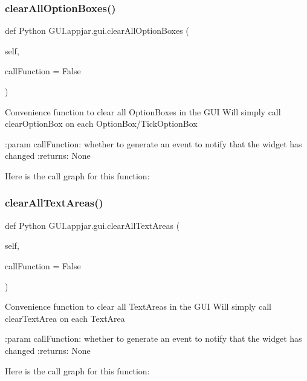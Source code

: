 \subsubsection{\texorpdfstring{clear\+All\+Option\+Boxes()}{clearAllOptionBoxes()}}
{\footnotesize\ttfamily def Python G\+U\+I.\+appjar.\+gui.\+clear\+All\+Option\+Boxes (\begin{DoxyParamCaption}\item[{}]{self,  }\item[{}]{call\+Function = {\ttfamily False} }\end{DoxyParamCaption})}

\begin{DoxyVerb}Convenience function to clear all OptionBoxes in the GUI
Will simply call clearOptionBox on each OptionBox/TickOptionBox

:param callFunction: whether to generate an event to notify that the widget has changed
:returns: None
\end{DoxyVerb}
 Here is the call graph for this function\+:
\mbox{\label{class_python_01_g_u_i_1_1appjar_1_1gui_aed07ef3bc3baf1e1b1545ba0cf12c7e1}} 
\subsubsection{\texorpdfstring{clear\+All\+Text\+Areas()}{clearAllTextAreas()}}
{\footnotesize\ttfamily def Python G\+U\+I.\+appjar.\+gui.\+clear\+All\+Text\+Areas (\begin{DoxyParamCaption}\item[{}]{self,  }\item[{}]{call\+Function = {\ttfamily False} }\end{DoxyParamCaption})}

\begin{DoxyVerb}Convenience function to clear all TextAreas in the GUI
Will simply call clearTextArea on each TextArea

:param callFunction: whether to generate an event to notify that the widget has changed
:returns: None
\end{DoxyVerb}
 Here is the call graph for this function\+:
\mbox{\label{class_python_01_g_u_i_1_1appjar_1_1gui_a2e43ed5ad69b9c005e03c0ead3f2ee55}} 
